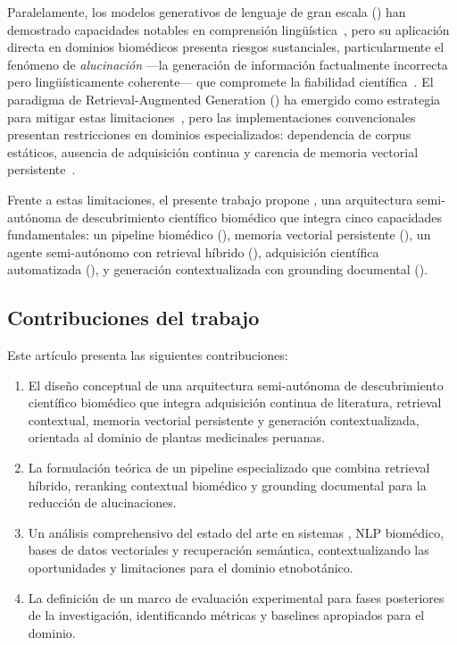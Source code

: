 Paralelamente, los modelos generativos de lenguaje de gran escala (\llms{}) han demostrado capacidades notables en comprensión lingüística~\cite{brown2020language, touvron2023llama}, pero su aplicación directa en dominios biomédicos presenta riesgos sustanciales, particularmente el fenómeno de \textit{alucinación} —la generación de información factualmente incorrecta pero lingüísticamente coherente— que compromete la fiabilidad científica~\cite{ji2023survey}. El paradigma de Retrieval-Augmented Generation (\rag{}) ha emergido como estrategia para mitigar estas limitaciones~\cite{lewis2020retrieval, guu2020realm}, pero las implementaciones convencionales presentan restricciones en dominios especializados: dependencia de corpus estáticos, ausencia de adquisición continua y carencia de memoria vectorial persistente~\cite{siriwardhana2023improving}.

Frente a estas limitaciones, el presente trabajo propone \sirca{}, una arquitectura semi-autónoma de descubrimiento científico biomédico que integra cinco capacidades fundamentales: un pipeline \rag{} biomédico (\componentone{}), memoria vectorial persistente (\componenttwo{}), un agente semi-autónomo con retrieval híbrido (\componentthree{}), adquisición científica automatizada (\componentfour{}), y generación contextualizada con grounding documental (\componentfive{}).

\subsection{Contribuciones del trabajo}
\label{subsec:contributions}

Este artículo presenta las siguientes contribuciones:

\begin{enumerate}[label=(\roman*)]
  \item El diseño conceptual de una arquitectura semi-autónoma de descubrimiento científico biomédico que integra adquisición continua de literatura, retrieval contextual, memoria vectorial persistente y generación contextualizada, orientada al dominio de plantas medicinales peruanas.

  \item La formulación teórica de un pipeline \rag{} especializado que combina retrieval híbrido, reranking contextual biomédico y grounding documental para la reducción de alucinaciones.

  \item Un análisis comprehensivo del estado del arte en sistemas \rag{}, NLP biomédico, bases de datos vectoriales y recuperación semántica, contextualizando las oportunidades y limitaciones para el dominio etnobotánico.

  \item La definición de un marco de evaluación experimental para fases posteriores de la investigación, identificando métricas y baselines apropiados para el dominio.
\end{enumerate}

